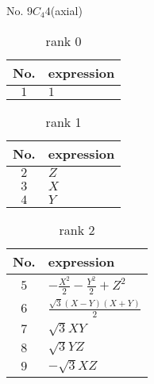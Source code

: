 \documentclass[fleqn,8pt,landscape]{jsarticle}
\begin{document}
\setcounter{MaxMatrixCols}{16}

\begin{center}
\LARGE
No. 9\quad$C_{4}$\quad$4$\quad[ tetragonal ] (axial)
\end{center}
\begin{table}[ht!]
\begin{center}
\caption{rank 0}
\renewcommand{\arraystretch}{1.3}
\begin{tabular}{cl} \hline \hline
No. & expression \\ \hline
$ 1 $ & $ 1 $ \\
 \hline \hline
\end{tabular}
\end{center}
\end{table}
\begin{table}[ht!]
\begin{center}
\caption{rank 1}
\renewcommand{\arraystretch}{1.3}
\begin{tabular}{cl} \hline \hline
No. & expression \\ \hline
$ 2 $ & $ Z $ \\
$ 3 $ & $ X $ \\
$ 4 $ & $ Y $ \\
 \hline \hline
\end{tabular}
\end{center}
\end{table}
\begin{table}[ht!]
\begin{center}
\caption{rank 2}
\renewcommand{\arraystretch}{1.3}
\begin{tabular}{cl} \hline \hline
No. & expression \\ \hline
$ 5 $ & $ - \frac{X^{2}}{2} - \frac{Y^{2}}{2} + Z^{2} $ \\
$ 6 $ & $ \frac{\sqrt{3} \left(X - Y\right) \left(X + Y\right)}{2} $ \\
$ 7 $ & $ \sqrt{3} X Y $ \\
$ 8 $ & $ \sqrt{3} Y Z $ \\
$ 9 $ & $ - \sqrt{3} X Z $ \\
 \hline \hline
\end{tabular}
\end{center}
\end{table}
\end{document}
